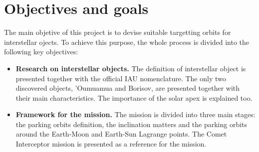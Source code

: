 \section{Objectives and goals}

The main objetive of this project is to devise suitable targetting orbits for
interstellar ojects. To achieve this purpose, the whole process is divided
into the following key objectives:

\begin{itemize}

    \item \textbf{Research on interstellar objects.}
        The definition of interstellar object is presented together with the
        official IAU nomenclature. The only two discovered objects,
        'Oumuamua and Borisov, are presented together with their main
        characteristics. The importance of the solar apex is explained
        too.






\item \textbf{Framework for the mission.}
        The mission is divided into three main stages: the parking orbits
        definition, the inclination matters and the parking orbits around the
        Earth-Moon and Earth-Sun Lagrange points. The Comet Interceptor mission
        is presented as a reference for the mission.

\end{itemize}
